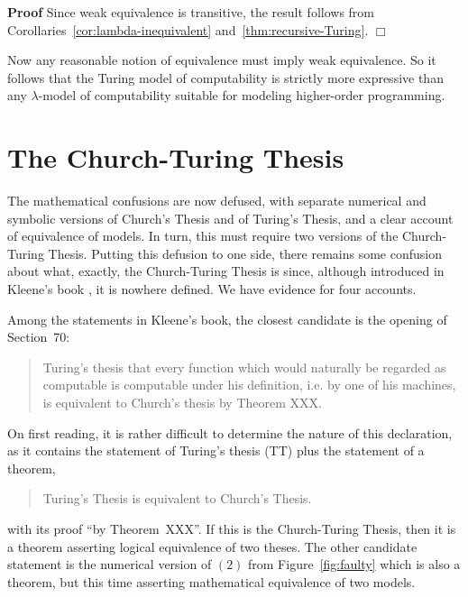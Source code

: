 \documentclass[a4paper]{article}
\newenvironment{proof}
	{\par\noindent\upshape\textbf{Proof}\quad}
	{\hspace*{\fill}$\Box$}
\begin{document}
\begin{proof}
  Since weak equivalence is transitive, the result follows from Corollaries~\ref{cor:lambda-inequivalent} and~\ref{thm:recursive-Turing}. 
\end{proof}

Now any reasonable notion of equivalence must imply weak equivalence.
So it follows that the Turing model of computability is strictly more
expressive than any $\lambda$-model of computability suitable for modeling
higher-order programming.


\section{The Church-Turing Thesis}
\label{sec:Church-Turing}

The mathematical confusions are now defused, with separate numerical and
symbolic versions of Church's Thesis and of Turing's Thesis, and a
clear account of equivalence of models. In turn, this must require two
versions of the Church-Turing Thesis. Putting this defusion to one
side, there remains some confusion about what, exactly, the
Church-Turing Thesis is since, although introduced in Kleene's book
\cite[page 382]{Kleene52}, it is nowhere defined. We have evidence
for four accounts.

Among the statements in Kleene's book, the closest candidate is the
opening of Section~70:
\begin{quote}
  Turing's thesis that every function which would naturally be
  regarded as computable is computable under his definition, i.e. by
  one of his machines, is equivalent to Church's thesis by Theorem
  XXX.
\end{quote}
On first reading, it is rather difficult to determine the nature of
this declaration, as it contains the statement of Turing's thesis (TT) 
plus the statement of a theorem, 
\begin{quote}
Turing's Thesis is equivalent to Church's Thesis.
\end{quote}
with its proof ``by Theorem~XXX''.  If this is the Church-Turing
Thesis, then it is a theorem asserting logical equivalence of two
theses. The other candidate statement is the numerical version of $(2)$
from Figure~\ref{fig:faulty} which is also a theorem, but this time
asserting mathematical equivalence of two models.
\end{document}
